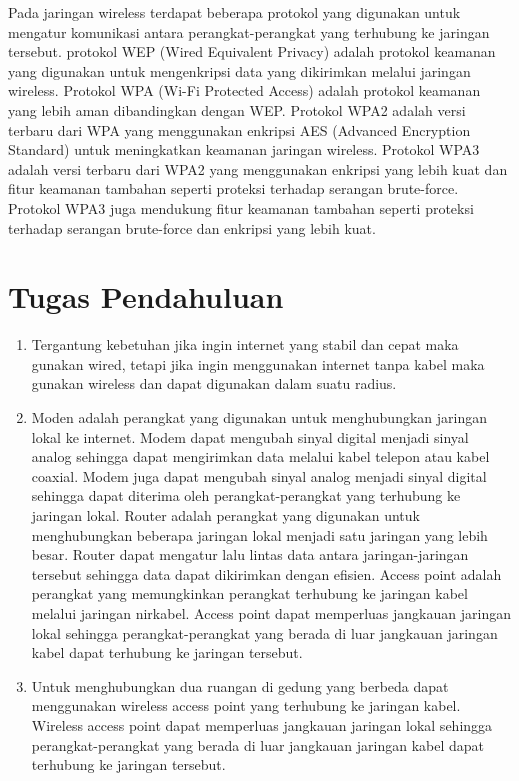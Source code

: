 Pada jaringan wireless terdapat beberapa protokol yang digunakan untuk mengatur komunikasi antara perangkat-perangkat yang terhubung ke jaringan tersebut.
protokol WEP (Wired Equivalent Privacy) adalah protokol keamanan yang digunakan untuk mengenkripsi data yang dikirimkan melalui jaringan wireless.
Protokol WPA (Wi-Fi Protected Access) adalah protokol keamanan yang lebih aman dibandingkan dengan WEP. Protokol WPA2 adalah versi terbaru dari WPA yang menggunakan enkripsi AES (Advanced Encryption Standard) untuk meningkatkan keamanan jaringan wireless.
Protokol WPA3 adalah versi terbaru dari WPA2 yang menggunakan enkripsi yang lebih kuat dan fitur keamanan tambahan seperti proteksi terhadap serangan brute-force.
Protokol WPA3 juga mendukung fitur keamanan tambahan seperti proteksi terhadap serangan brute-force dan enkripsi yang lebih kuat.
\section{Tugas Pendahuluan}
\begin{enumerate}
	\item Tergantung kebetuhan jika ingin internet yang stabil dan cepat maka gunakan wired, tetapi jika ingin 
		menggunakan internet tanpa kabel maka gunakan wireless dan dapat digunakan dalam suatu radius.
	\item Moden adalah perangkat yang digunakan untuk menghubungkan jaringan lokal ke internet. Modem dapat mengubah sinyal digital
	menjadi sinyal analog sehingga dapat mengirimkan data melalui kabel telepon atau kabel coaxial. Modem juga dapat mengubah sinyal analog menjadi sinyal digital sehingga dapat diterima oleh perangkat-perangkat yang terhubung ke jaringan lokal.
	Router adalah perangkat yang digunakan untuk menghubungkan beberapa jaringan lokal menjadi satu jaringan yang lebih besar. Router dapat mengatur lalu lintas data antara jaringan-jaringan tersebut sehingga data dapat dikirimkan dengan efisien.
	Access point adalah perangkat yang memungkinkan perangkat terhubung ke jaringan kabel melalui jaringan nirkabel. Access point dapat memperluas jangkauan jaringan lokal sehingga perangkat-perangkat yang berada di luar jangkauan jaringan kabel dapat terhubung ke jaringan tersebut.
	\item Untuk menghubungkan dua ruangan di gedung yang berbeda dapat menggunakan wireless access point yang terhubung ke jaringan kabel. 
	Wireless access point dapat memperluas jangkauan jaringan lokal sehingga perangkat-perangkat yang berada di luar jangkauan jaringan kabel dapat terhubung ke jaringan tersebut.
\end{enumerate}